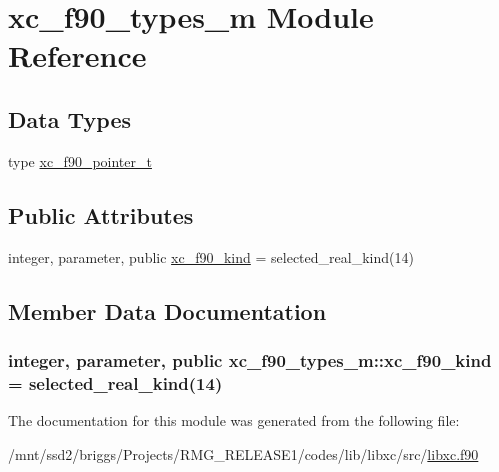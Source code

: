 \hypertarget{classxc__f90__types__m}{\section{xc\-\_\-f90\-\_\-types\-\_\-m Module Reference}
\label{classxc__f90__types__m}
}
\subsection*{Data Types}
\begin{DoxyCompactItemize}
\item 
type \hyperlink{structxc__f90__types__m_1_1xc__f90__pointer__t}{xc\-\_\-f90\-\_\-pointer\-\_\-t}
\end{DoxyCompactItemize}
\subsection*{Public Attributes}
\begin{DoxyCompactItemize}
\item 
integer, parameter, public \hyperlink{classxc__f90__types__m_a969270580619114341b13c432435c7bf}{xc\-\_\-f90\-\_\-kind} = selected\-\_\-real\-\_\-kind(14)
\end{DoxyCompactItemize}


\subsection{Member Data Documentation}
\hypertarget{classxc__f90__types__m_a969270580619114341b13c432435c7bf}{
\subsubsection[{xc\-\_\-f90\-\_\-kind}]{\setlength{\rightskip}{0pt plus 5cm}integer, parameter, public xc\-\_\-f90\-\_\-types\-\_\-m\-::xc\-\_\-f90\-\_\-kind = selected\-\_\-real\-\_\-kind(14)}}\label{classxc__f90__types__m_a969270580619114341b13c432435c7bf}


The documentation for this module was generated from the following file\-:\begin{DoxyCompactItemize}
\item 
/mnt/ssd2/briggs/\-Projects/\-R\-M\-G\-\_\-\-R\-E\-L\-E\-A\-S\-E1/codes/lib/libxc/src/\hyperlink{libxc_8f90}{libxc.\-f90}\end{DoxyCompactItemize}
